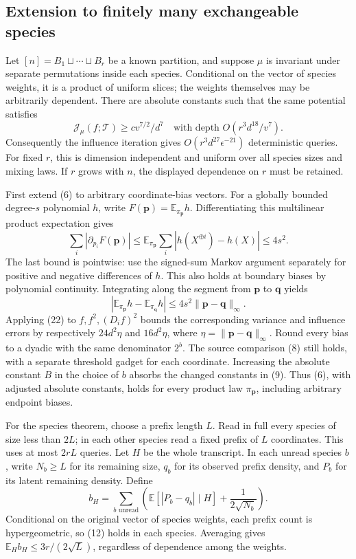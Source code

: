 \subsection{Extension to finitely many exchangeable
species}\label{influence-recovery:extension-to-finitely-many-exchangeable-species}

Let \([n]=B_1\sqcup\cdots\sqcup B_r\) be a known partition, and suppose
\(\mu\) is invariant under separate permutations inside each species.
Conditional on the vector of species weights, it is a product of uniform
slices; the weights themselves may be arbitrarily dependent. There are
absolute constants such that the same potential satisfies \[
 \mathcal J_\mu(f;\mathcal T)\ge c v^{7/2}/d^7
 \quad\text{with depth }O(r^3d^{18}/v^7).                 \tag{20}
\] Consequently the influence iteration gives
\(O(r^3d^{27}\epsilon^{-21})\) deterministic queries. For fixed \(r\),
this is dimension independent and uniform over all species sizes and
mixing laws. If \(r\) grows with \(n\), the displayed dependence on
\(r\) must be retained.

First extend (6) to arbitrary coordinate-bias vectors. For a globally
bounded degree-\(s\) polynomial \(h\), write
\(F(\mathbf p)=\mathbb E_{\pi_{\mathbf p}}h\). Differentiating this
multilinear product expectation gives \[
 \sum_i|\partial_{p_i}F(\mathbf p)|
 \le\mathbb E_{\pi_{\mathbf p}}
      \sum_i|h(X^{\oplus i})-h(X)|\le4s^2.               \tag{21}
\] The last bound is pointwise: use the signed-sum Markov argument
separately for positive and negative differences of \(h\). This also
holds at boundary biases by polynomial continuity. Integrating along the
segment from \(\mathbf p\) to \(\mathbf q\) yields \[
 |\mathbb E_{\pi_{\mathbf p}}h-
       \mathbb E_{\pi_{\mathbf q}}h|
 \le4s^2\|\mathbf p-\mathbf q\|_\infty.                 \tag{22}
\] Applying (22) to \(f,f^2,(D_i f)^2\) bounds the corresponding
variance and influence errors by respectively \(24d^2\eta\) and
\(16d^2\eta\), where \(\eta=\|\mathbf p-\mathbf q\|_\infty\). Round
every bias to a dyadic with the same denominator \(2^b\). The source
comparison (8) still holds, with a separate threshold gadget for each
coordinate. Increasing the absolute constant \(B\) in the choice of
\(b\) absorbs the changed constants in (9). Thus (6), with adjusted
absolute constants, holds for every product law \(\pi_{\mathbf p}\),
including arbitrary endpoint biases.

For the species theorem, choose a prefix length \(L\). Read in full
every species of size less than \(2L\); in each other species read a
fixed prefix of \(L\) coordinates. This uses at most \(2rL\) queries.
Let \(H\) be the whole transcript. In each unread species \(b\), write
\(N_b\ge L\) for its remaining size, \(q_b\) for its observed prefix
density, and \(P_b\) for its latent remaining density. Define \[
 b_H=\sum_{b\text{ unread}}
       \left(\mathbb E[|P_b-q_b|\mid H]+\frac1{2\sqrt{N_b}}\right).
\] Conditional on the original vector of species weights, each prefix
count is hypergeometric, so (12) holds in each species. Averaging gives
\(\mathbb E_H b_H\le3r/(2\sqrt L)\), regardless of dependence among the
weights.

